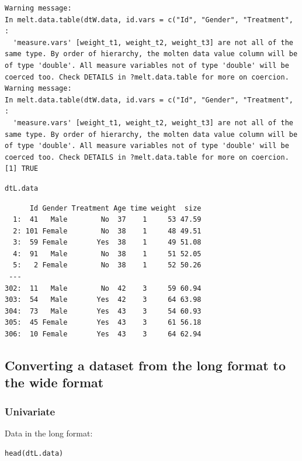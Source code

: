 \documentclass{article}
\begin{document}
\begin{verbatim}
Warning message:
In melt.data.table(dtW.data, id.vars = c("Id", "Gender", "Treatment",  :
  'measure.vars' [weight_t1, weight_t2, weight_t3] are not all of the same type. By order of hierarchy, the molten data value column will be of type 'double'. All measure variables not of type 'double' will be coerced too. Check DETAILS in ?melt.data.table for more on coercion.
Warning message:
In melt.data.table(dtW.data, id.vars = c("Id", "Gender", "Treatment",  :
  'measure.vars' [weight_t1, weight_t2, weight_t3] are not all of the same type. By order of hierarchy, the molten data value column will be of type 'double'. All measure variables not of type 'double' will be coerced too. Check DETAILS in ?melt.data.table for more on coercion.
[1] TRUE
\end{verbatim}

\lstset{language=r,label= ,caption= ,captionpos=b,numbers=none}
\begin{lstlisting}
dtL.data
\end{lstlisting}

\begin{verbatim}
      Id Gender Treatment Age time weight  size
  1:  41   Male        No  37    1     53 47.59
  2: 101 Female        No  38    1     48 49.51
  3:  59 Female       Yes  38    1     49 51.08
  4:  91   Male        No  38    1     51 52.05
  5:   2 Female        No  38    1     52 50.26
 ---                                           
302:  11   Male        No  42    3     59 60.94
303:  54   Male       Yes  42    3     64 63.98
304:  73   Male       Yes  43    3     54 60.93
305:  45 Female       Yes  43    3     61 56.18
306:  10 Female       Yes  43    3     64 62.94
\end{verbatim}

\subsection{Converting a dataset from the long format to the wide format}
\label{sec:orgfe10e97}

\subsubsection{Univariate}
\label{sec:orgce5b2ef}
Data in the long format:
\lstset{language=r,label= ,caption= ,captionpos=b,numbers=none}
\begin{lstlisting}
head(dtL.data)
\end{lstlisting}
\end{document}
